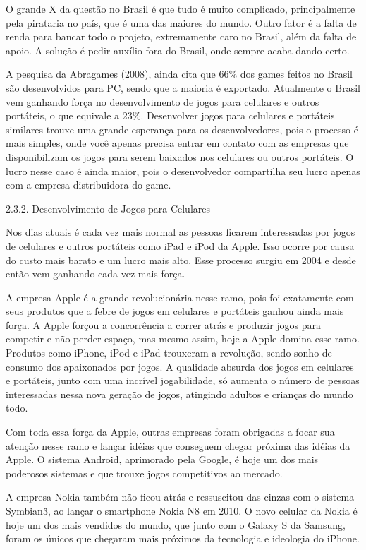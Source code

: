 O grande X da questão no Brasil é que tudo é muito complicado, principalmente pela pirataria no país, que é uma das maiores do mundo. Outro fator é a falta de renda para bancar todo o projeto, extremamente caro no Brasil, além da falta de apoio. A solução é pedir auxílio fora do Brasil, onde sempre acaba dando certo.

A pesquisa da Abragames (2008), ainda cita que 66\% dos games feitos no Brasil são desenvolvidos para PC, sendo que a maioria é exportado. Atualmente o Brasil vem ganhando força no desenvolvimento de jogos para celulares e outros portáteis, o que equivale a 23\%. Desenvolver jogos para celulares e portáteis similares trouxe uma grande esperança para os desenvolvedores, pois o processo é mais simples, onde você apenas precisa entrar em contato com as empresas que disponibilizam os jogos para serem baixados nos celulares ou outros portáteis. O lucro nesse caso é ainda maior, pois o desenvolvedor compartilha seu lucro apenas com a empresa distribuidora do game.

2.3.2.  Desenvolvimento de Jogos para Celulares

Nos dias atuais é cada vez mais normal as pessoas ficarem interessadas por jogos de celulares e outros portáteis como iPad e iPod da Apple. Isso ocorre por causa do custo mais barato e um lucro mais alto. Esse processo surgiu em 2004 e desde então vem ganhando cada vez mais força. 

A empresa Apple é a grande revolucionária nesse ramo, pois foi exatamente com seus produtos que a febre de jogos em celulares e portáteis ganhou ainda mais força. A Apple forçou a concorrência a correr atrás e produzir jogos para competir e não perder espaço, mas mesmo assim, hoje a Apple domina esse ramo. Produtos como iPhone, iPod e iPad trouxeram a revolução, sendo sonho de consumo dos apaixonados por jogos. A qualidade absurda dos jogos em celulares e portáteis, junto com uma incrível jogabilidade, só aumenta o número de pessoas interessadas nessa nova geração de jogos, atingindo adultos e crianças do mundo todo.

Com toda essa força da Apple, outras empresas foram obrigadas a focar sua atenção nesse ramo e lançar idéias que conseguem chegar próxima das idéias da Apple. O sistema Android, aprimorado pela Google, é hoje um dos mais poderosos sistemas e que trouxe jogos competitivos ao mercado.

A empresa Nokia também não ficou atrás e ressuscitou das cinzas com o sistema Symbian\^3, ao lançar o smartphone Nokia N8 em 2010. O novo celular da Nokia é hoje um dos mais vendidos do mundo, que junto com o Galaxy S da Samsung, foram os únicos que chegaram mais próximos da tecnologia e ideologia do iPhone.

